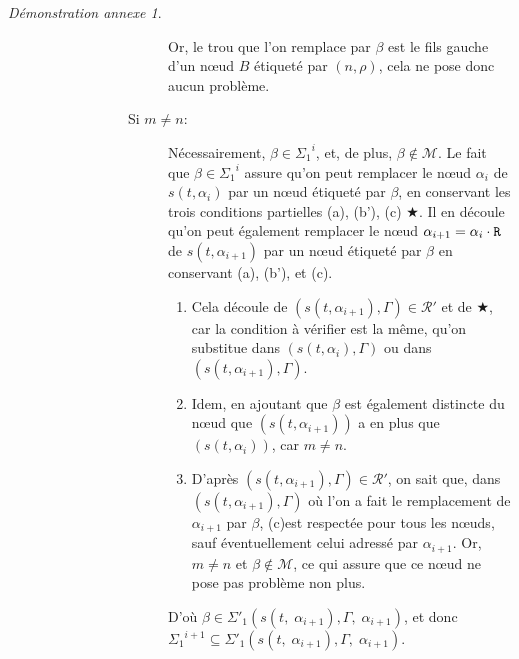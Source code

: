 \documentclass[11pt,a4paper]{article}
\theoremstyle{plain}
\theoremstyle{definition}
\theoremstyle{remark}
\newtheorem{demonstrationappendix}{Démonstration annexe}
\newcommand*{\sequent}{\Gamma}
\newcommand*{\Right}{\textnormal{\texttt{R}}}
\newcommand*{\representationspartial}{\ensuremath{\mathcal{R'}}}
\newcommand*{\highapprox}{\ensuremath{\Sigma_1}}
\newcommand*{\highapproxspec}{\ensuremath{\Sigma'_1}}
\newcommand*{\treesimplify}{\ensuremath{s}}
\newcommand*{\caddpartial}{(a)}
\newcommand*{\clinpartial}{(b')}
\newcommand*{\cdespartial}{(c)}
\begin{document}
\begin{demonstrationappendix}
\begin{description}
\begin{description}
\begin{description}
\begin{description}
                            Or, le trou que l'on remplace par $\beta$ est le fils gauche d'un n\oe ud $B$ étiqueté par $(n, \rho)$, cela ne pose donc aucun problème.
                            
                        \item[Si $m \neq n$:] 
                            Nécessairement, $\beta \in {\highapprox}^{i}$, et, de plus, $\beta \notin \mathcal{M}$. Le fait que $\beta \in {\highapprox}^{i}$ assure qu'on peut remplacer le n\oe ud $\alpha_i$ de $s(t, \alpha_i)$ par un n\oe ud étiqueté par $\beta$, en conservant les trois conditions partielles \caddpartial, \clinpartial, \cdespartial{} $\bigstar$. Il en découle qu'on peut également remplacer le n\oe ud $\alpha_{i+1} = \alpha_i \cdot \Right$ de $s(t, \alpha_{i+1})$ par un n\oe ud étiqueté par $\beta$ en conservant \caddpartial, \clinpartial, et \cdespartial.
    
                        \begin{enumerate}
                            \item Cela découle de $(s(t, \alpha_{i+1}), \sequent) \in \representationspartial$ et de $\bigstar$, car la condition à vérifier est la même, qu'on substitue dans $(s(t, \alpha_{i}), \sequent)$ ou dans $(s(t, \alpha_{i+1}), \sequent)$.
    
                            \item Idem, en ajoutant que $\beta$ est également distincte du n\oe ud que $(s(t, \alpha_{i+1}))$ a en plus que $(s(t, \alpha_{i}))$, car $m \neq n$.
    
                            \item D'après $(s(t, \alpha_{i+1}), \sequent) \in \representationspartial$, on sait que, dans $(s(t, \alpha_{i+1}), \sequent)$ où l'on a fait le remplacement de $\alpha_{i+1}$ par $\beta$, \cdespartial est respectée pour tous les n\oe uds, sauf éventuellement celui adressé par $\alpha_{i+1}$. Or, $m \neq n$ et $\beta \notin \mathcal{M}$, ce qui assure que ce n\oe ud ne pose pas problème non plus.
                        \end{enumerate}
                        
                        D'où $\beta \in \highapproxspec \left( \treesimplify( t, \; {\alpha}_{i+1} ), \sequent, \; {\alpha}_{i+1} \right)$, et donc ${\highapprox}^{i+1} \subseteq \highapproxspec \left( \treesimplify( t, \; {\alpha}_{i+1} ), \sequent, \; {\alpha}_{i+1} \right)$.
                    \end{description}


\end{description}
\end{description}
\end{description}
\end{demonstrationappendix}
\end{document}
